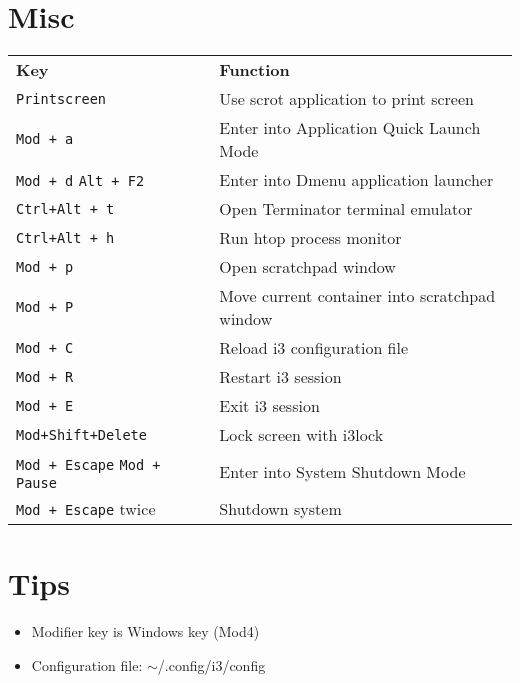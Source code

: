 \documentclass[landscape]{article}
\newcommand{\thead}[1]{{\color{black}\bf#1}}
\newcommand{\blankfirst}{%
  \ifodd\rownum\advance\rownum1\relax\fi}
\begin{document}
\begin{multicols}{3}
\section*{Misc}
  \blankfirst
  \noindent\begin{tabular}{p{0.9in}p{2in}} %
    \thead{Key} & \thead{Function}\\
    \verb|Printscreen | & Use scrot application to print screen\\
    \verb|Mod + a | & Enter into Application Quick Launch Mode\\
    \verb|Mod + d| \verb|Alt + F2 | & Enter into Dmenu application launcher\\
    \verb|Ctrl+Alt + t | & Open Terminator terminal emulator\\
    \verb|Ctrl+Alt + h | & Run htop process monitor\\
    \verb|Mod + p | & Open scratchpad window\\
    \verb|Mod + P | & Move current container into scratchpad window\\
    \verb|Mod + C| & Reload i3 configuration file\\
    \verb|Mod + R| & Restart i3 session\\
    \verb|Mod + E| & Exit i3 session\\
    \verb|Mod+Shift+Delete| & Lock screen with i3lock\\
    \verb|Mod + Escape| \verb|Mod + Pause | & Enter into System Shutdown Mode\\
    \verb|Mod + Escape| twice & Shutdown system\\
  \end{tabular}

  \section*{Tips}
  \begin{itemize}
  \item Modifier key is Windows key (Mod4)
  \item Configuration file: $\sim$/.config/i3/config
  \end{itemize}
\end{multicols}
\end{document}
